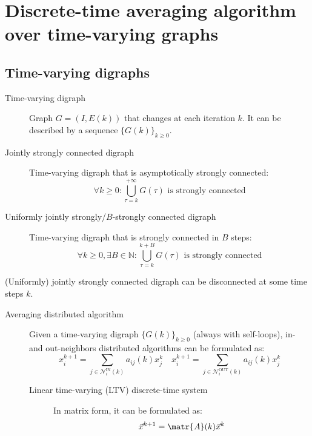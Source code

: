 \section{Discrete-time averaging algorithm over time-varying graphs}


\subsection{Time-varying digraphs}

\begin{description}
    \item[Time-varying digraph] 
        Graph $G=(I, E(k))$ that changes at each iteration $k$. It can be described by a sequence $\{ G(k) \}_{k \geq 0}$.

    \item[Jointly strongly connected digraph] 
        Time-varying digraph that is asymptotically strongly connected:
        \[ \forall k \geq 0: \bigcup_{\tau=k}^{+\infty} G(\tau) \text{ is strongly connected} \]

    \item[Uniformly jointly strongly/$B$-strongly connected digraph]   
        Time-varying digraph that is strongly connected in $B$ steps:
        \[ \forall k \geq 0, \exists B \in \mathbb{N}: \bigcup_{\tau=k}^{k+B} G(\tau) \text{ is strongly connected} \]
\end{description}

\begin{remark}
    (Uniformly) jointly strongly connected digraph can be disconnected at some time steps $k$.
\end{remark}

\begin{description}
    \item[Averaging distributed algorithm] 
        Given a time-varying digraph $\{ G(k) \}_{k \geq 0}$ (always with self-loops), in- and out-neighbors distributed algorithms can be formulated as:
        \[
            x_i^{k+1} = \sum_{j \in \mathcal{N}_i^\text{IN}(k)} a_{ij}(k) x_j^k
            \quad
            x_i^{k+1} = \sum_{j \in \mathcal{N}_i^\text{OUT}(k)} a_{ij}(k) x_j^k
        \]

        \begin{description}
            \item[Linear time-varying (LTV) discrete-time system] 
                In matrix form, it can be formulated as:
                \[ \vec{x}^{k+1} = \matr{A}(k) \vec{x}^k \]
        \end{description}
\end{description}


